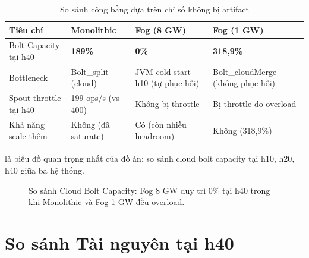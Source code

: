 \documentclass[13pt,a4paper]{report}
\begin{document}
\begin{table}[H]
\centering
\caption{So sánh công bằng dựa trên chỉ số không bị artifact}
\label{tab:fair-compare}
\small
\begin{tabular}{p{} p{} p{} p{}}
\toprule
\textbf{Tiêu chí} & \textbf{Monolithic} & \textbf{Fog (8 GW)} & \textbf{Fog (1 GW)} \\
\midrule
Bolt Capacity tại h40 & \textbf{189\%} & \textbf{0\%} & \textbf{318,9\%} \\
Bottleneck & Bolt\_split (cloud) & JVM cold-start h10 (tự phục hồi) & Bolt\_cloudMerge (không phục hồi) \\
Spout throttle tại h40 & 199 ops/s (vs 400) & Không bị throttle & Bị throttle do overload \\
Khả năng scale thêm & Không (đã saturate) & Có (còn nhiều headroom) & Không (318,9\%) \\
\bottomrule
\end{tabular}
\end{table}

 là biểu đồ quan trọng nhất của đồ án: so sánh cloud bolt
capacity tại h10, h20, h40 giữa ba hệ thống.

\begin{figure}[H]
\centering
{}
\caption{So sánh Cloud Bolt Capacity: Fog 8 GW duy trì 0\% tại h40 trong khi Monolithic và Fog 1 GW đều overload.}
\label{fig:cap-h40}
\end{figure}

\section{So sánh Tài nguyên tại h40}
\end{document}
